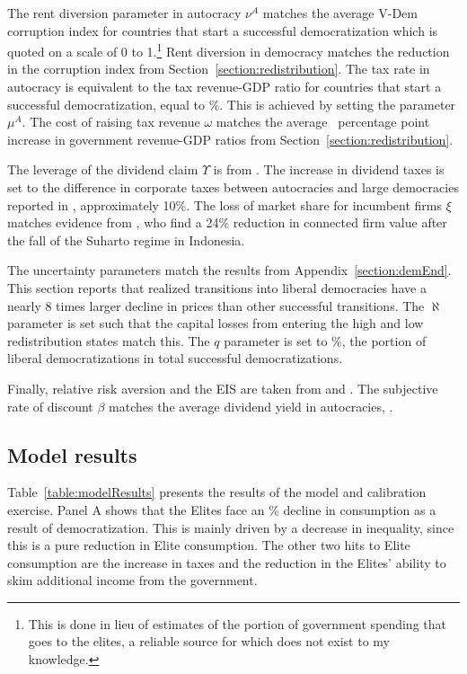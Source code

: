 \documentclass[12pt]{article}
\numberwithin{equation}{section}
\begin{document}
The rent diversion parameter in autocracy $\nu^A$ matches the average V-Dem corruption index for countries that start a successful democratization which is quoted on a scale of 0 to 1.\footnote{This is done in lieu of estimates of the portion of government spending that goes to the elites, a reliable source for which does not exist to my knowledge.} Rent diversion in democracy matches the reduction in the corruption index from Section~\ref{section:redistribution}. The tax rate in autocracy is equivalent to the tax revenue-GDP ratio for countries that start a successful democratization, equal to \autocracyTax\%. This is achieved by setting the parameter $\mu^A$. The cost of raising tax revenue $\omega$ matches the average \tabEightOneCE\ percentage point increase in government revenue-GDP ratios from Section~\ref{section:redistribution}.

The leverage of the dividend claim $\Upsilon$ is from \cite{Wachter2013}. The increase in dividend taxes is set to the difference in corporate taxes between autocracies and large democracies reported in \cite*{Genschel2016}, approximately 10\%. The loss of market share for incumbent firms $\xi$ matches evidence from \cite{Fisman2001}, who find a 24\% reduction in connected firm value after the fall of the Suharto regime in Indonesia.

The uncertainty parameters match the results from Appendix~\ref{section:demEnd}. This section reports that realized transitions into liberal democracies have a nearly 8 times larger decline in prices than other successful transitions. The $\aleph$ parameter is set such that the capital losses from entering the high and low redistribution states match this. The $q$ parameter is set to  \pctLibDem\%, the portion of liberal democratizations in total successful democratizations.

Finally, relative risk aversion and the EIS are taken from \cite{Catherine2021} and \cite*{Bansal2010}. The subjective rate of discount $\beta$ matches the average dividend yield in autocracies, \tabTwelveDivYldAutData.

\subsection{Model results}
\label{section:model_results}
Table~\ref{table:modelResults} presents the results of the model and calibration exercise. Panel A shows that the Elites face an \tabTwelveEliteConsDrop\% decline in consumption as a result of democratization. This is mainly driven by a decrease in inequality, since this is a pure reduction in Elite consumption. The other two hits to Elite consumption are the increase in taxes and the reduction in the Elites' ability to skim additional income from the government.
\end{document}
